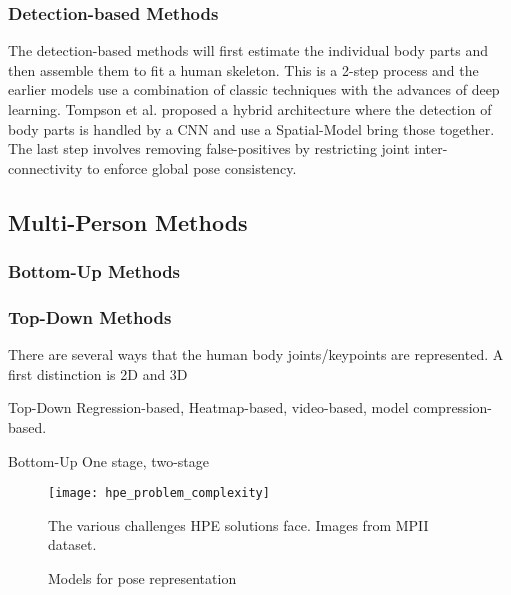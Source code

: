 \subsubsection{Detection-based Methods}
The detection-based methods will first estimate the individual body parts and then assemble them to fit a human skeleton.
This is a 2-step process and the earlier models use a combination of classic techniques with the advances of deep learning.
Tompson et al.\cite{TompsonJLB14} proposed a hybrid architecture where the detection of body parts is handled by a \gls{CNN} and use a Spatial-Model bring those together.
The last step involves removing false-positives by restricting joint inter-connectivity to enforce global pose consistency.


\subsection{Multi-Person Methods}


\subsubsection{Bottom-Up Methods}

\subsubsection{Top-Down Methods}




There are several ways that the human body joints/keypoints are represented.
A first distinction is 2D and 3D

Top-Down
Regression-based, Heatmap-based, video-based, model compression-based.

Bottom-Up
One stage, two-stage


\begin{figure}
	\centering
	\texttt{[image: hpe\_problem\_complexity]}
	\caption{The various challenges HPE solutions face. Images from \gls{MPII} dataset. \cite{Andriluka2014}\cite{Chen2000}}
	\label{fig:hpe_problem_complexity}
\end{figure}

\begin{figure}
	\centering
	\caption{Models for pose representation \cite{Zheng2012}}
	\label{fig:pose_representation}
\end{figure}

